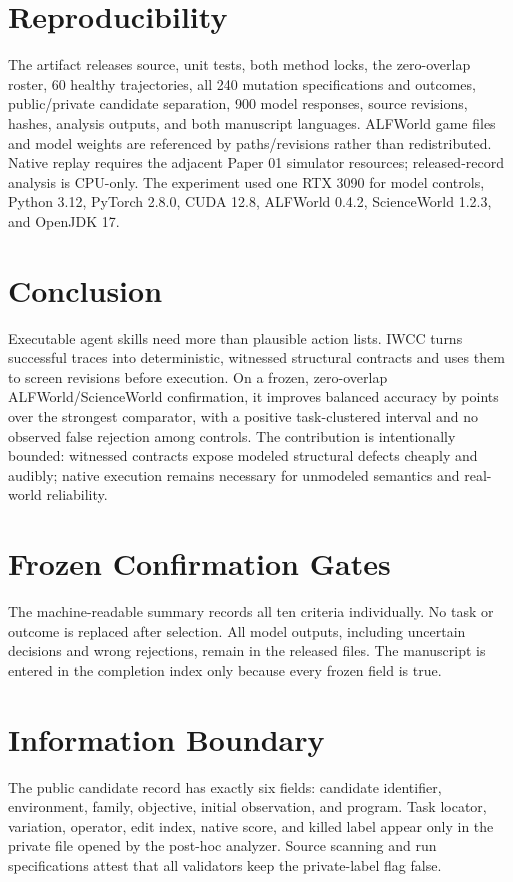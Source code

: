\documentclass[10pt]{article}
\begin{document}
\section{Reproducibility}
The artifact releases source, unit tests, both method locks, the zero-overlap roster, 60 healthy trajectories, all 240 mutation specifications and outcomes, public/private candidate separation, 900 model responses, source revisions, hashes, analysis outputs, and both manuscript languages. ALFWorld game files and model weights are referenced by paths/revisions rather than redistributed. Native replay requires the adjacent Paper 01 simulator resources; released-record analysis is CPU-only. The experiment used one RTX 3090 for model controls, Python 3.12, PyTorch 2.8.0, CUDA 12.8, ALFWorld 0.4.2, ScienceWorld 1.2.3, and OpenJDK 17.

\section{Conclusion}
Executable agent skills need more than plausible action lists. IWCC turns successful traces into deterministic, witnessed structural contracts and uses them to screen revisions before execution. On a frozen, zero-overlap ALFWorld/ScienceWorld confirmation, it improves balanced accuracy by \GainPoints{} points over the strongest comparator, with a positive task-clustered interval and no observed false rejection among \ControlCount{} controls. The contribution is intentionally bounded: witnessed contracts expose modeled structural defects cheaply and audibly; native execution remains necessary for unmodeled semantics and real-world reliability.




\appendix
\section{Frozen Confirmation Gates}
The machine-readable summary records all ten criteria individually. No task or outcome is replaced after selection. All model outputs, including uncertain decisions and wrong rejections, remain in the released files. The manuscript is entered in the completion index only because every frozen field is true.

\section{Information Boundary}
The public candidate record has exactly six fields: candidate identifier, environment, family, objective, initial observation, and program. Task locator, variation, operator, edit index, native score, and killed label appear only in the private file opened by the post-hoc analyzer. Source scanning and run specifications attest that all validators keep the private-label flag false.
\end{document}
